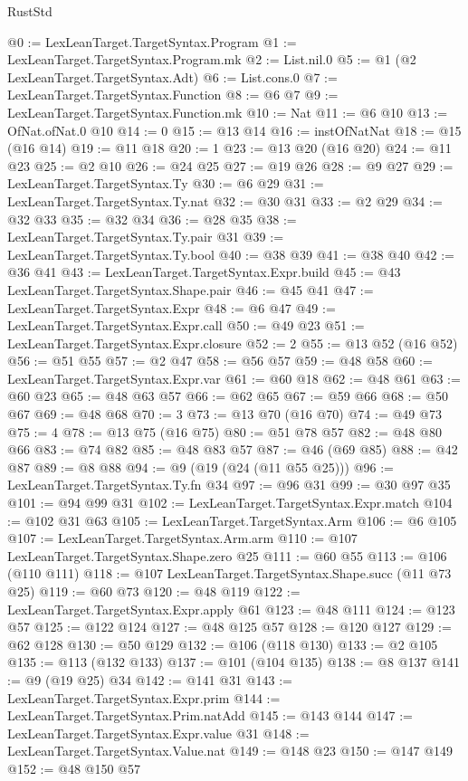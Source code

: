 \begin{lexlean}{RustStd}
\begin{coremodule}
@0 := LexLeanTarget.TargetSyntax.Program
@1 := LexLeanTarget.TargetSyntax.Program.mk
@2 := List.nil.{0}
@5 := @1 (@2 LexLeanTarget.TargetSyntax.Adt)
@6 := List.cons.{0}
@7 := LexLeanTarget.TargetSyntax.Function
@8 := @6 @7
@9 := LexLeanTarget.TargetSyntax.Function.mk
@10 := Nat
@11 := @6 @10
@13 := OfNat.ofNat.{0} @10
@14 := 0
@15 := @13 @14
@16 := instOfNatNat
@18 := @15 (@16 @14)
@19 := @11 @18
@20 := 1
@23 := @13 @20 (@16 @20)
@24 := @11 @23
@25 := @2 @10
@26 := @24 @25
@27 := @19 @26
@28 := @9 @27
@29 := LexLeanTarget.TargetSyntax.Ty
@30 := @6 @29
@31 := LexLeanTarget.TargetSyntax.Ty.nat
@32 := @30 @31
@33 := @2 @29
@34 := @32 @33
@35 := @32 @34
@36 := @28 @35
@38 := LexLeanTarget.TargetSyntax.Ty.pair @31
@39 := LexLeanTarget.TargetSyntax.Ty.bool
@40 := @38 @39
@41 := @38 @40
@42 := @36 @41
@43 := LexLeanTarget.TargetSyntax.Expr.build
@45 := @43 LexLeanTarget.TargetSyntax.Shape.pair
@46 := @45 @41
@47 := LexLeanTarget.TargetSyntax.Expr
@48 := @6 @47
@49 := LexLeanTarget.TargetSyntax.Expr.call
@50 := @49 @23
@51 := LexLeanTarget.TargetSyntax.Expr.closure
@52 := 2
@55 := @13 @52 (@16 @52)
@56 := @51 @55
@57 := @2 @47
@58 := @56 @57
@59 := @48 @58
@60 := LexLeanTarget.TargetSyntax.Expr.var
@61 := @60 @18
@62 := @48 @61
@63 := @60 @23
@65 := @48 @63 @57
@66 := @62 @65
@67 := @59 @66
@68 := @50 @67
@69 := @48 @68
@70 := 3
@73 := @13 @70 (@16 @70)
@74 := @49 @73
@75 := 4
@78 := @13 @75 (@16 @75)
@80 := @51 @78 @57
@82 := @48 @80 @66
@83 := @74 @82
@85 := @48 @83 @57
@87 := @46 (@69 @85)
@88 := @42 @87
@89 := @8 @88
@94 := @9 (@19 (@24 (@11 @55 @25)))
@96 := LexLeanTarget.TargetSyntax.Ty.fn @34
@97 := @96 @31
@99 := @30 @97 @35
@101 := @94 @99 @31
@102 := LexLeanTarget.TargetSyntax.Expr.match
@104 := @102 @31 @63
@105 := LexLeanTarget.TargetSyntax.Arm
@106 := @6 @105
@107 := LexLeanTarget.TargetSyntax.Arm.arm
@110 := @107 LexLeanTarget.TargetSyntax.Shape.zero @25
@111 := @60 @55
@113 := @106 (@110 @111)
@118 := @107 LexLeanTarget.TargetSyntax.Shape.succ (@11 @73 @25)
@119 := @60 @73
@120 := @48 @119
@122 := LexLeanTarget.TargetSyntax.Expr.apply @61
@123 := @48 @111
@124 := @123 @57
@125 := @122 @124
@127 := @48 @125 @57
@128 := @120 @127
@129 := @62 @128
@130 := @50 @129
@132 := @106 (@118 @130)
@133 := @2 @105
@135 := @113 (@132 @133)
@137 := @101 (@104 @135)
@138 := @8 @137
@141 := @9 (@19 @25) @34
@142 := @141 @31
@143 := LexLeanTarget.TargetSyntax.Expr.prim
@144 := LexLeanTarget.TargetSyntax.Prim.natAdd
@145 := @143 @144
@147 := LexLeanTarget.TargetSyntax.Expr.value @31
@148 := LexLeanTarget.TargetSyntax.Value.nat
@149 := @148 @23
@150 := @147 @149
@152 := @48 @150 @57

\end{coremodule}
\end{lexlean}
